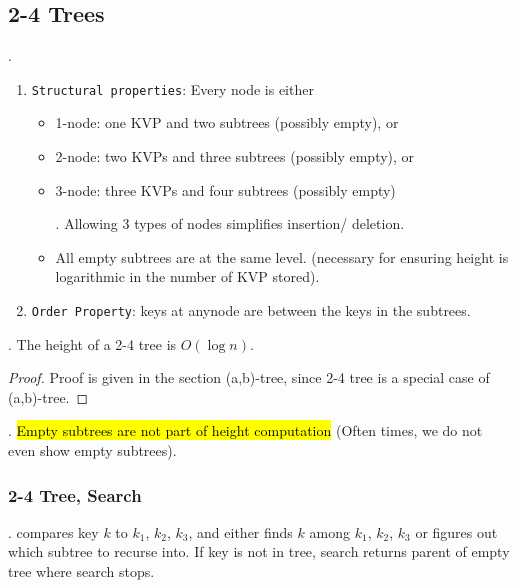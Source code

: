 \documentclass{article}
\begin{document}
\subsection{2-4 Trees} 

\begin{deff}.
    \begin{enumerate}
        \item \texttt{Structural properties}: Every node is either 
        \begin{itemize}
            \item 1-node: one KVP and two subtrees (possibly empty), or 
            \item 2-node: two KVPs and three subtrees (possibly empty), or 
            \item 3-node: three KVPs and four subtrees (possibly empty)
            \begin{comm}[].
                Allowing 3 types of nodes simplifies insertion/ deletion. 
            \end{comm}
            \item All empty subtrees are at the same level. (necessary for ensuring height is logarithmic in the number of KVP stored).  
        \end{itemize}
        \item \texttt{Order Property}: keys at anynode are between the keys in the subtrees. 
    \end{enumerate}
\end{deff}

\begin{thmm}[].
    The height of a 2-4 tree is $O(\log n)$. 
\end{thmm}

\begin{proof}
    Proof is given in the section (a,b)-tree, since 2-4 tree is a special case of (a,b)-tree. 
\end{proof}

\begin{comm}[].
    \hl{Empty subtrees are not part of height computation} (Often times, we do not even show empty subtrees). 
\end{comm}

\subsubsection{2-4 Tree, Search}

\begin{codes}[].
     compares key $k$ to $k_1$, $k_2$, $k_3$, and either finds $k$ among $k_1$, $k_2$, $k_3$ or figures out which subtree to recurse into. If key is not in tree, search returns parent of empty tree where search stops. 
\end{codes}
\end{document}

